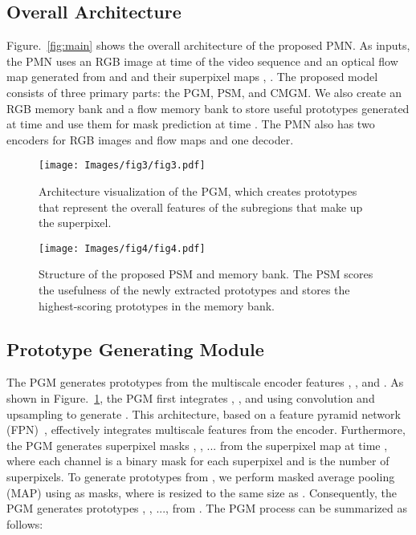 \documentclass[10pt,twocolumn,letterpaper]{article}
\begin{document}
\subsection{Overall Architecture}
Figure.~\ref{fig:main} shows the overall architecture of the proposed PMN. As inputs, the PMN uses an RGB image  at time  of the video sequence and an optical flow map  generated from  and  and their superpixel maps , . The proposed model consists of three primary parts: the PGM, PSM, and CMGM. We also create an RGB memory bank and a flow memory bank to store useful prototypes generated at time  and use them for mask prediction at time . The PMN also has two encoders for RGB images and flow maps and one decoder.

\begin{figure}[t]
	\setlength{\belowcaptionskip}{-24pt}
	\begin{center}
		\texttt{[image: Images/fig3/fig3.pdf]}
		\caption{Architecture visualization of the PGM, which creates prototypes that represent the overall features of the subregions that make up the superpixel.}
		\label{fig:PGM}
	\end{center}
\end{figure}

\begin{figure*}[t]
	\setlength{\belowcaptionskip}{-24pt}
	\begin{center}
		\texttt{[image: Images/fig4/fig4.pdf]}
		\caption{Structure of the proposed PSM and memory bank. The PSM scores the usefulness of the newly extracted prototypes and stores the highest-scoring prototypes in the memory bank.}
		\label{fig:PSM}
	\end{center}
\end{figure*}

\subsection{Prototype Generating Module}
The PGM generates prototypes from the multiscale encoder features , , and . As shown in Figure.~\ref{fig:PGM}, the PGM first integrates , , and  using  convolution and upsampling to generate . This architecture, based on a feature pyramid network (FPN)~\cite{lin2017feature}, effectively integrates multiscale features from the encoder. Furthermore, the PGM generates superpixel masks , , ...  from the superpixel map  at time , where each channel is a binary mask for each superpixel and  is the number of superpixels. To generate prototypes from , we perform masked average pooling (MAP) using  as masks, where  is resized to the same size as . Consequently, the PGM generates  prototypes , , ...,  from . The PGM process can be summarized as follows: 
\end{document}
